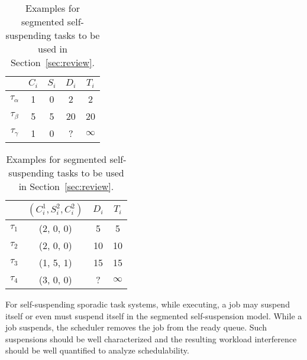\ifpaper
\begin{table}[t]
\else
\begin{table} 
\fi
\centering
    \begin{tabular}{|c|c|c|c|c|}
 \hline
        & $C_i$ &  $S_i$&  $D_i$ & $T_i$\\ 
        \hline
        $\tau_\alpha$ & 1 & 0 &  2 & 2\\ 
        $\tau_\beta$ &  5&  5& 20 & 20 \\ 
        $\tau_\gamma$ & 1 & 0  & ? & $\infty$ \\ 
        \hline
    \end{tabular} 
    \caption{Examples for dynamic self-suspending tasks to be used in Section~\ref{sec:review}.}
    \label{table:dynamic-example}
\end{table}

\ifpaper
\begin{table}[t]
\else
\begin{table} 
\fi
\centering
    \begin{tabular}{|c|c|c|c|}
 \hline
        & $(C_i^1, S_i^2, C_i^2)$ &  $D_i$ & $T_i$\\ 
        \hline
        $\tau_1$ & (2, 0, 0) &  5 & 5\\ 
        $\tau_2$ &  (2, 0, 0) & 10 & 10 \\ 
        $\tau_3$ & (1, 5, 1) & 15  & 15\\
        $\tau_4$ & (3, 0, 0) & ? & $\infty$\\
        \hline
    \end{tabular} 
    \caption{Examples for segmented self-suspending tasks to be used in Section~\ref{sec:review}.}
    \label{table:static-example}
\end{table}

For self-suspending sporadic task systems, while executing, a job may suspend itself or even must suspend itself in the segmented self-suspension model. While a job suspends, the scheduler removes the job from the ready queue. Such suspensions should be well characterized and the resulting workload interference should be well quantified to analyze schedulability.


\end{table}
\end{table}

